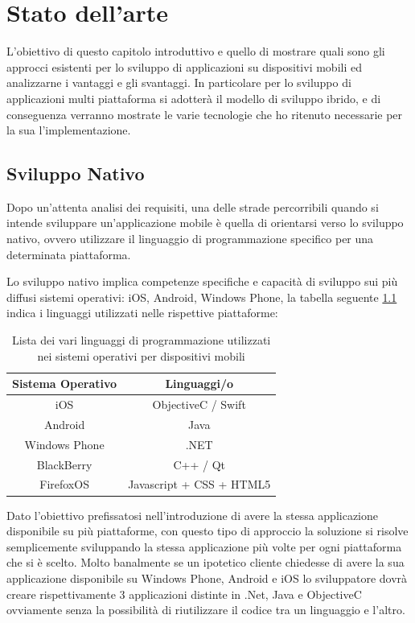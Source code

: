 \chapter{Stato dell'arte} 
L'obiettivo di questo capitolo introduttivo e quello di mostrare quali sono gli approcci esistenti per lo sviluppo di applicazioni su dispositivi mobili ed analizzarne i vantaggi e gli svantaggi.
In particolare per lo sviluppo di applicazioni multi piattaforma si adotterà il modello di sviluppo ibrido, e di conseguenza verranno mostrate le varie tecnologie che ho ritenuto necessarie per la sua l'implementazione.

\section{Sviluppo Nativo}
Dopo un'attenta analisi dei requisiti, una delle strade percorribili quando si intende sviluppare un'applicazione mobile è quella di orientarsi verso lo sviluppo nativo, ovvero utilizzare il linguaggio di programmazione specifico per una determinata piattaforma.

Lo sviluppo nativo implica competenze specifiche e capacità di sviluppo sui più diffusi sistemi operativi: iOS, Android, Windows Phone, la tabella seguente \ref{tbl: TabellaOS} indica i linguaggi utilizzati nelle rispettive piattaforme:

\begin{table}[h]
	\centering
    	\begin{tabular}{cc}
      	\hline
        	\textbf{Sistema Operativo} & \textbf{Linguaggi/o}     \\ \hline
        	iOS                        & ObjectiveC / Swift       \\ \hline
        	Android                    & Java                     \\ \hline
        	Windows Phone              & .NET                     \\ \hline
        	BlackBerry                 & C++ / Qt                 \\ \hline
        	FirefoxOS                  & Javascript + CSS + HTML5 \\ \hline
    	\end{tabular}
    	\caption{Lista dei vari linguaggi di programmazione utilizzati nei sistemi operativi per dispositivi 		
    			 mobili}
		\label{tbl: TabellaOS}
\end{table}

Dato l'obiettivo prefissatosi nell'introduzione di avere la stessa applicazione disponibile su più piattaforme, con questo tipo di approccio la soluzione si risolve semplicemente sviluppando la stessa applicazione più volte per ogni piattaforma che si è scelto. 
Molto banalmente se un ipotetico cliente chiedesse di avere la sua applicazione disponibile su Windows Phone, Android e iOS lo sviluppatore dovrà creare rispettivamente 3 applicazioni distinte in .Net, Java e ObjectiveC ovviamente senza la possibilità di riutilizzare il codice tra un linguaggio e l'altro.

